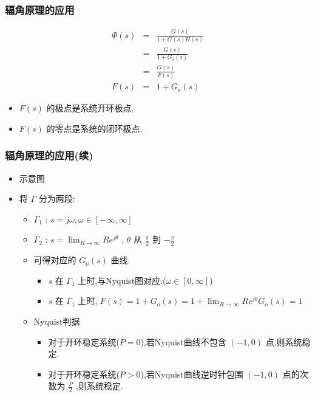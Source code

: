 \documentclass[table]{beamer}
\begin{document}
\begin{frame}
\frametitle{辐角原理的应用}
\label{sec-4-1-3}

\begin{eqnarray*}
\Phi(s) &= &\frac{G(s)}{1+G(s)H(s)} \\
       &=&\frac{G(s)}{1+G_o(s)} \\
       &=&\frac{G(s)}{F(s)} \\
 F(s)&=&1+G_o(s)
\end{eqnarray*}
\begin{itemize}
\item $F(s)$  的极点是系统开环极点,
\item $F(s)$  的零点是系统的闭环极点.
\end{itemize}
\end{frame}
\begin{frame}
\frametitle{辐角原理的应用(续)}
\label{sec-4-1-4}
\begin{itemize}

\item 示意图
\label{sec-4-1-4-1}%


\item 将 $\Gamma$ 分为两段:
\label{sec-4-1-4-2}%
\begin{itemize}
\item $\Gamma_1$ : $s=j\omega,\omega\in[-\infty,\infty]$
\item $\Gamma_2$ : $s=\lim_{R\rightarrow\infty}Re^{j\theta}$ , $\theta$ 从 $\frac{\pi}{2}$ 到 $-\frac{\pi}{2}$
\item 可得对应的 $G_o(s)$ 曲线.
\begin{itemize}
\item $s$ 在 $\Gamma_1$ 上时,与Nyquist图对应.($\omega\in[0,\infty]$)
\item $s$ 在 $\Gamma_1$ 上时, $F(s)=1+G_o(s)=1+\lim_{R\rightarrow\infty}Re^{j\theta}G_o(s)=1$
\end{itemize}
\item <3-> Nyquist判据
\begin{itemize}
\item 对于开环稳定系统($P=0$),若Nyquist曲线不包含 $(-1,0)$ 点,则系统稳定.
\item 对于开环稳定系统($P>0$),若Nyquist曲线逆时针包围 $(-1,0)$ 点的次数为 $\frac{P}{2}$ ,则系统稳定.
\end{itemize}
\end{itemize}

\end{itemize} %
\end{frame}
\end{document}
